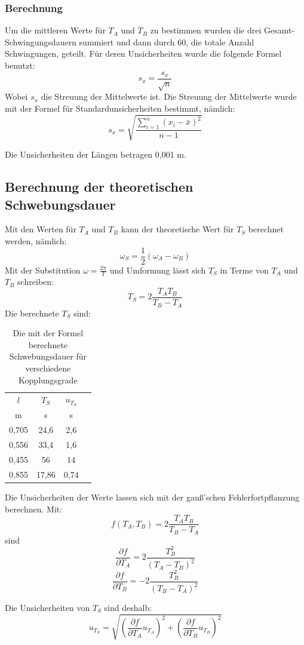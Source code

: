 \documentclass[11pt,a4paper]{article}
\begin{document}
\subsubsection{Berechnung}
Um die mittleren Werte für $T_A$ und $T_B$ zu bestimmen wurden die drei Gesamt-Schwingungsdauern summiert und dann durch 60, die totale Anzahl Schwingungen, geteilt. Für deren Unsicherheiten wurde die folgende Formel benutzt:
$$ s_{\bar{x}} = \frac{s_x}{\sqrt{n}}$$
Wobei $s_x$ die Streuung der Mittelwerte ist. Die Streuung der Mittelwerte wurde mit der Formel für Standardunsicherheiten bestimmt, nämlich:
$$s_x=\sqrt{\frac{\sum_{i=1}^{n}(x_i-\bar{x})^2}{n-1}}$$

Die Unsicherheiten der Längen betragen 0,001 m. 

\subsection{Berechnung der theoretischen Schwebungsdauer}
Mit den Werten für $T_A$ und $T_B$ kann der theoretische Wert für $T_S$ berechnet werden, nämlich:
$$\omega_S = \frac{1}{2}(\omega_A-\omega_B)$$
Mit der Substitution $\omega = \frac{2\pi}{T}$ und Umformung lässt sich $T_S$ in Terme von $T_A$ und $T_B$ schreiben:
\begin{equation}
T_S = 2\frac{T_A T_B}{T_B-T_A}
\end{equation}
Die berechnete $T_S$ sind:

\begin{table}[h]
	\centering
	\begin{tabular*}{0.99\textwidth}{@{\extracolsep{\fill}}cccc}
		\toprule
		$l$ & $T_S$ & $u_{T_S}$  \\
		m & s & s   \\
		\bottomrule
		0,705 & 24,6 & 2,6 \\
		0,556 & 33,4 & 1,6 \\
		0,455 & 56 & 14 \\
		0,855 & 17,86 & 0,74 \\
		\bottomrule
	\end{tabular*}
	\caption{Die mit der Formel berechnete Schwebungsdauer für verschiedene Kopplungsgrade}
	\label{tabelle}
\end{table}
Die Unsicherheiten der Werte lassen sich mit der gauß'schen Fehlerfortpflanzung berechnen. Mit:
$$f(T_A,T_B) = 2\frac{T_A T_B}{T_B-T_A}$$ 
sind
$$\frac{\partial f}{\partial T_A} = 2\frac{T_B^2}{(T_A-T_B)^2}$$
$$\frac{\partial f}{\partial T_B} = -2\frac{T_B^2}{(T_B-T_A)^2}$$

Die Unsicherheiten von $T_S$ sind deshalb:
$$u_{T_S} = \sqrt{(\frac{\partial f}{\partial T_A}u_{T_A})^2+(\frac{\partial f}{\partial T_B}u_{T_B})^2}$$
\end{document}
